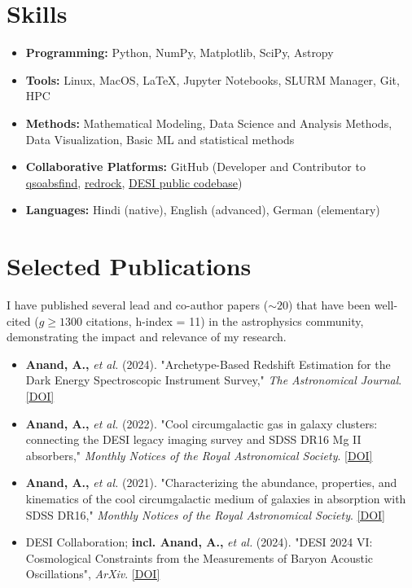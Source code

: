 \documentclass[a4paper,10pt]{article}
\begin{document}
\section*{Skills}
\begin{itemize}[noitemsep, topsep=0pt]
    \item \textbf{Programming:} Python, NumPy, Matplotlib, SciPy, Astropy
    \item \textbf{Tools:} Linux, MacOS, LaTeX, Jupyter Notebooks, SLURM Manager, Git, HPC
    \item \textbf{Methods:} Mathematical Modeling, Data Science and Analysis Methods, Data Visualization, Basic ML and statistical methods
    \item \textbf{Collaborative Platforms:} GitHub (Developer and Contributor to \href{https://github.com/abhi0395/qsoabsfind}{qsoabsfind}, \href{https://github.com/desihub/redrock}{redrock}, \href{https://github.com/desihub}{DESI public codebase})
     \item \textbf{Languages:} Hindi (native), English (advanced), German (elementary)
\end{itemize}


\section*{Selected Publications}
I have published several lead and co-author papers ($\sim 20$) that have been well-cited ($g\geq 1300$ citations, h-index = 11) in the astrophysics community, demonstrating the impact and relevance of my research.
\begin{itemize}[noitemsep, topsep=0pt]
    \item \textbf{Anand, A.,} \textit{et al.} (2024). "Archetype-Based Redshift Estimation for the Dark Energy Spectroscopic Instrument Survey," \textit{The Astronomical Journal}. \href{https://iopscience.iop.org/article/10.3847/1538-3881/ad60c2}{[DOI]}
    \item \textbf{Anand, A.,} \textit{et al.} (2022). "Cool circumgalactic gas in galaxy clusters: connecting the DESI legacy imaging survey and SDSS DR16 Mg II absorbers," \textit{Monthly Notices of the Royal Astronomical Society}. \href{https://doi.org/10.1093/mnras/stab871}{[DOI]}
    \item \textbf{Anand, A.,} \textit{et al.} (2021). "Characterizing the abundance, properties, and kinematics of the cool circumgalactic medium of galaxies in absorption with SDSS DR16," \textit{Monthly Notices of the Royal Astronomical Society}. \href{https://doi.org/10.1093/mnras/stac928}{[DOI]}
    \item DESI Collaboration; \textbf{incl. Anand, A.,} \textit{et al.} (2024). "DESI 2024 VI: Cosmological Constraints from the Measurements of Baryon Acoustic Oscillations", \textit{ArXiv}. \href{10.48550/arXiv.2404.03002}{[DOI]}
\end{itemize}
\end{document}
